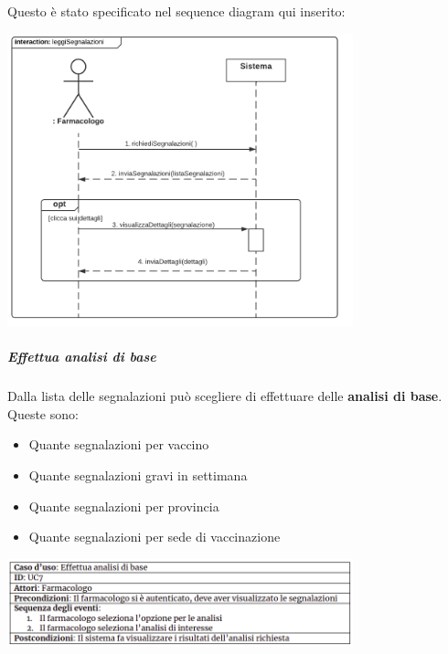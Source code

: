 \documentclass{article}
\begin{document}
\newpage
Questo è stato specificato nel sequence diagram qui inserito:
\begin{center}
    \includegraphics[width=0.75\textwidth]{pictures/SDFarmacologo1_Segnalazioni.png}
\end{center}
\subparagraph*{Effettua analisi di base}
Dalla lista delle segnalazioni può scegliere di effettuare delle \textbf{analisi di base}. Queste sono:
\begin{itemize}
    \item Quante segnalazioni per vaccino
    \item Quante segnalazioni gravi in settimana
    \item Quante segnalazioni per provincia 
    \item Quante segnalazioni per sede di vaccinazione
\end{itemize}
\begin{center}
    \includegraphics[width=0.75\textwidth]{pictures/UC7.png}
\end{center}
\end{document}
